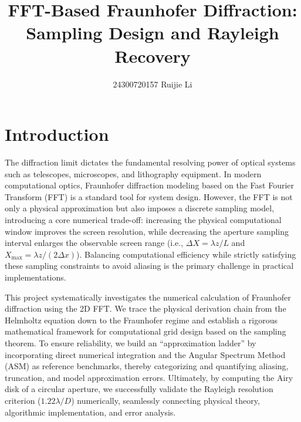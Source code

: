 \documentclass[12pt]{article}
\begin{document}
 
 
\title{FFT-Based Fraunhofer Diffraction: Sampling Design and Rayleigh Recovery}
\author{24300720157 Ruijie Li}

\maketitle

\tableofcontents
\newpage

\section{Introduction}

The diffraction limit dictates the fundamental resolving power of optical systems such as telescopes, 
microscopes, and lithography equipment. In modern computational optics, Fraunhofer diffraction modeling 
based on the Fast Fourier Transform (FFT) is a standard tool for system design. However, the FFT is not
only a physical approximation but also imposes a discrete sampling model, introducing a core numerical 
trade-off: increasing the physical computational window improves the screen resolution, while decreasing
the aperture sampling interval enlarges the observable screen range (i.e., \(\Delta X = \lambda z / L\) 
and \(X_{\max} = \lambda z / (2\Delta x)\)). Balancing computational efficiency while strictly satisfying
these sampling constraints to avoid aliasing is the primary challenge in practical implementations.

This project systematically investigates the numerical calculation of Fraunhofer diffraction using the 2D FFT.
We trace the physical derivation chain from the Helmholtz equation down to the Fraunhofer regime and 
establish a rigorous mathematical framework for computational grid design based on the sampling theorem.
To ensure reliability, we build an ``approximation ladder'' by incorporating direct numerical integration 
and the Angular Spectrum Method (ASM) as reference benchmarks, thereby categorizing and quantifying aliasing,
truncation, and model approximation errors. Ultimately, by computing the Airy disk of a circular 
aperture, we successfully validate the Rayleigh resolution criterion (\(1.22 \lambda / D\)) numerically, 
seamlessly connecting physical theory, algorithmic implementation, and error analysis.
\end{document}
